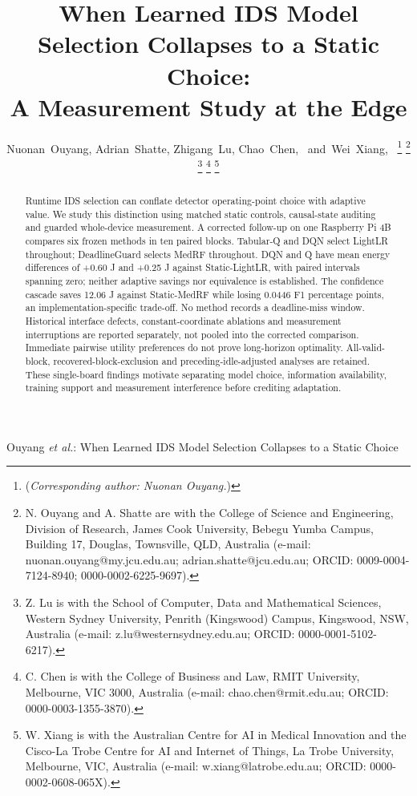 \documentclass[journal]{IEEEtran}
\begin{document}
\title{When Learned IDS Model Selection Collapses to a Static Choice:\\A Measurement Study at the Edge}
\author{Nuonan~Ouyang,
        Adrian~Shatte,
        Zhigang~Lu,
        Chao~Chen,~
        and~Wei~Xiang,~%
\thanks{(\textit{Corresponding author: Nuonan Ouyang.})}%
\thanks{N. Ouyang and A. Shatte are with the College of Science and Engineering, Division of Research, James Cook University, Bebegu Yumba Campus, Building 17, Douglas, Townsville, QLD, Australia (e-mail: nuonan.ouyang@my.jcu.edu.au; adrian.shatte@jcu.edu.au; ORCID: 0009-0004-7124-8940; 0000-0002-6225-9697).}%
\thanks{Z. Lu is with the School of Computer, Data and Mathematical Sciences, Western Sydney University, Penrith (Kingswood) Campus, Kingswood, NSW, Australia (e-mail: z.lu@westernsydney.edu.au; ORCID: 0000-0001-5102-6217).}%
\thanks{C. Chen is with the College of Business and Law, RMIT University, Melbourne, VIC 3000, Australia (e-mail: chao.chen@rmit.edu.au; ORCID: 0000-0003-1355-3870).}%
\thanks{W. Xiang is with the Australian Centre for AI in Medical Innovation and the Cisco-La Trobe Centre for AI and Internet of Things, La Trobe University, Melbourne, VIC, Australia (e-mail: w.xiang@latrobe.edu.au; ORCID: 0000-0002-0608-065X).}%
}
%
{Ouyang \MakeLowercase{\textit{et al.}}: When Learned IDS Model Selection Collapses to a Static Choice}
\maketitle
\begin{abstract}
Runtime IDS selection can conflate detector operating-point choice with adaptive value. We study this distinction using matched static controls, causal-state auditing and guarded whole-device measurement. A corrected follow-up on one Raspberry Pi 4B compares six frozen methods in ten paired blocks. Tabular-Q and DQN select LightLR throughout; DeadlineGuard selects MedRF throughout. DQN and Q have mean energy differences of +0.60 J and +0.25 J against Static-LightLR, with paired intervals spanning zero; neither adaptive savings nor equivalence is established. The confidence cascade saves 12.06 J against Static-MedRF while losing 0.0446 F1 percentage points, an implementation-specific trade-off. No method records a deadline-miss window. Historical interface defects, constant-coordinate ablations and measurement interruptions are reported separately, not pooled into the corrected comparison. Immediate pairwise utility preferences do not prove long-horizon optimality. All-valid-block, recovered-block-exclusion and preceding-idle-adjusted analyses are retained. These single-board findings motivate separating model choice, information availability, training support and measurement interference before crediting adaptation.
\end{abstract}
\end{document}
